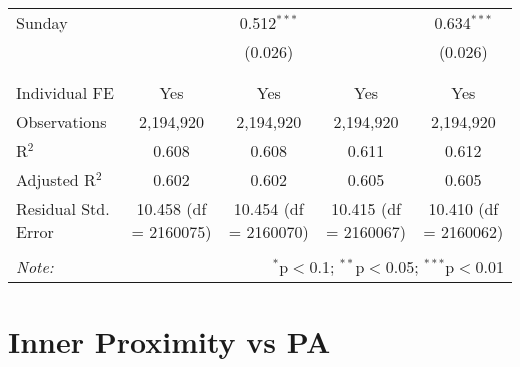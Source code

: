 \documentclass[
]{article}
\begin{document}
\begin{table}[!htbp]
{\begin{tabular}{@{\extracolsep{5pt}}lcccc}
 Sunday &  & 0.512$^{***}$ &  & 0.634$^{***}$ \\ 
  &  & (0.026) &  & (0.026) \\ 
  & & & & \\ 
\hline \\[-1.8ex] 
Individual FE & Yes & Yes & Yes & Yes \\ 
Observations & 2,194,920 & 2,194,920 & 2,194,920 & 2,194,920 \\ 
R$^{2}$ & 0.608 & 0.608 & 0.611 & 0.612 \\ 
Adjusted R$^{2}$ & 0.602 & 0.602 & 0.605 & 0.605 \\ 
Residual Std. Error & 10.458 (df = 2160075) & 10.454 (df = 2160070) & 10.415 (df = 2160067) & 10.410 (df = 2160062) \\ 
\hline 
\hline \\[-1.8ex] 
\textit{Note:}  & \multicolumn{4}{r}{$^{*}$p$<$0.1; $^{**}$p$<$0.05; $^{***}$p$<$0.01} \\ 
\end{tabular}
} 
\end{table} 
\newpage
\section{Inner Proximity vs PA}
\end{document}
